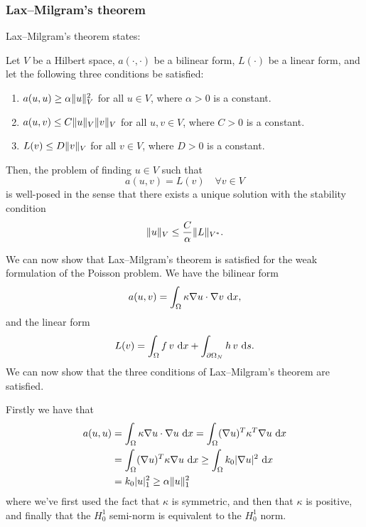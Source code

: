 \subsubsection{Lax--Milgram's theorem} %
Lax--Milgram's theorem states: %
\begin{theorem}
    Let $V$ be a Hilbert space, $a(\cdot, \cdot)$ be a bilinear form, $L(\cdot)$ be a linear form, and let the following three conditions be satisfied:
    \begin{enumerate}
        \item $a(u, u) \geq \alpha \lVert u\rVert_V^2$ for all $u \in V$, where $\alpha > 0$ is a constant.

        \item $a(u, v) \leq C \lVert u\rVert_V \lVert v\rVert_V$ for all $u, v \in V$, where $C > 0$ is a constant.

        \item $L(v) \leq D \lVert v\rVert_V$ for all $v \in V$, where $D > 0$ is a constant.
    \end{enumerate}
    Then, the problem of finding $u \in V$ such that
    \begin{equation}
        a(u, v) = L(v) \quad \forall v \in V
    \end{equation}
    is well-posed in the sense that there exists a unique solution with the stability condition
    \begin{equation}
        \lVert u\rVert_V \leq \frac{C}{\alpha} \lVert L\rVert_{V^*}.
    \end{equation}
\end{theorem}

We can now show that Lax--Milgram's theorem is satisfied for the weak formulation of the Poisson problem. %
We have the bilinear form
\begin{equation}
    a(u, v) = \int_\Omega \kappa \nabla u \cdot \nabla v \, \mathop{}\!\mathrm{d} x,
\end{equation}
and the linear form
\begin{equation}
    L(v) = \int_\Omega f \, v \, \mathop{}\!\mathrm{d} x + \int_{\partial\Omega_N} h \, v \, \mathop{}\!\mathrm{d} s.
\end{equation}
We can now show that the three conditions of Lax--Milgram's theorem are satisfied. %

Firstly we have that
\begin{align*}
    a(u, u)
    &= \int_\Omega \kappa \nabla u \cdot \nabla u \, \mathop{}\!\mathrm{d} x
    = \int_\Omega (\nabla u)^T \kappa^T \nabla u \, \mathop{}\!\mathrm{d} x \\
    &= \int_\Omega (\nabla u)^T \kappa \nabla u \, \mathop{}\!\mathrm{d} x
    \geq \int_\Omega k_0 \lvert\nabla u\rvert^2 \, \mathop{}\!\mathrm{d} x \\
    &= k_0 \lvert u\rvert^2_1
    \geq \alpha \lVert u\rVert_1^2
\end{align*}
where we've first used the fact that $\kappa$ is symmetric, and then that $\kappa$ is positive, and finally that the $H^1_0$ semi-norm is equivalent to the $H^1_0$ norm.

